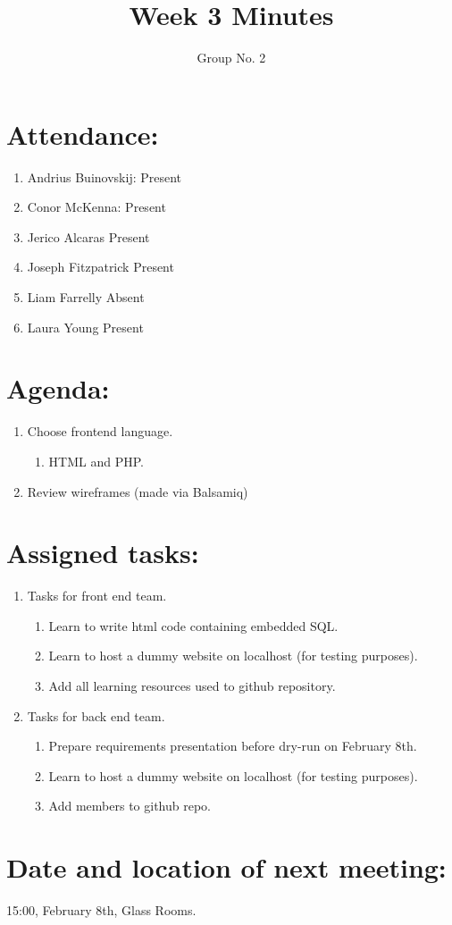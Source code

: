 \documentclass[a4paper, 12pt]{article}
\begin{document}
\title{Week 3 Minutes}
\author{Group No. 2}
\maketitle

	\section{Attendance:}
		\begin{enumerate}[label*=\arabic*.]
			\item Andrius Buinovskij:	\dotfill Present
			\item Conor McKenna:		\dotfill Present
			\item Jerico Alcaras		\dotfill Present
			\item Joseph Fitzpatrick	\dotfill Present
			\item Liam Farrelly		\dotfill Absent
			\item Laura Young		\dotfill Present
		\end{enumerate}

	\section{Agenda:}
		\begin{enumerate}[label*=\arabic*.]
			\item Choose frontend language.
			\begin{enumerate}[label*=\arabic*.]
				\item HTML and PHP.
			\end{enumerate}
			\item Review wireframes (made via Balsamiq)
		\end{enumerate}

	\section{Assigned tasks:}
		\begin{enumerate}[label*=\arabic*.]
			\item Tasks for front end team.
			\begin{enumerate}[label*=\arabic*.]
				\item Learn to write html code containing embedded SQL.
				\item Learn to host a dummy website on localhost (for testing purposes).
				\item Add all learning resources used to github repository.
			\end{enumerate}
			\newpage
			\item Tasks for back end team.
			\begin{enumerate}[label*=\arabic*.]
				\item Prepare requirements presentation before dry-run on February 8th.
				\item Learn to host a dummy website on localhost (for testing purposes).
				\item Add members to github repo.
			\end{enumerate}
		\end{enumerate}

	\section{Date and location of next meeting:}
		15:00, February 8th, Glass Rooms.
\end{document}
